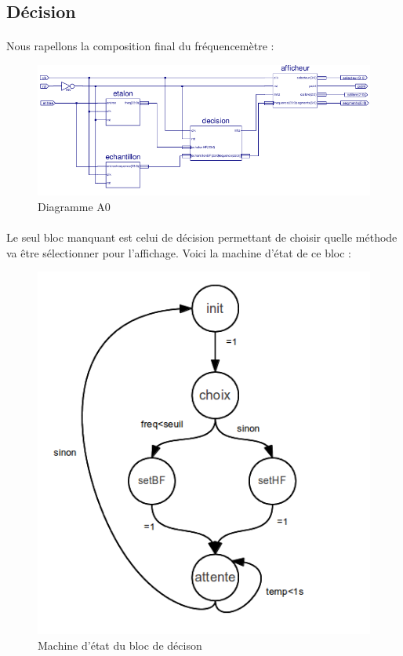 \documentclass[a4paper,11pt]{article}
\begin{document}
  \subsection{Décision}
 \paragraph{} Nous rapellons la composition final du fréquencemètre :
 
\begin{figure}[H]
\begin{center}
	\includegraphics[scale=.9]{sch-frequencemetre.png}
	\caption{Diagramme A0}
\end{center}
\end{figure}

  \paragraph{}Le seul bloc manquant est celui de décision permettant de choisir quelle méthode va être 
  sélectionner pour l'affichage. Voici la machine d'état de ce bloc :
  
   \begin{figure}[H]
\begin{center}
	\includegraphics[scale=.6]{machine_decision.png}
	\caption{Machine d'état du bloc de décison}
\end{center}
\end{figure}
  
\end{document}
